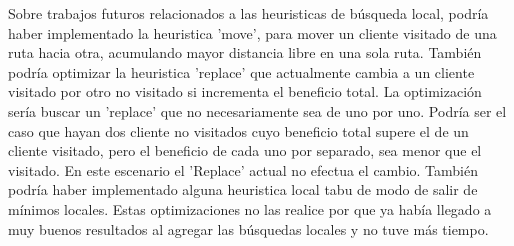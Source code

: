 \bigskip

Sobre trabajos futuros relacionados a las heuristicas de búsqueda local, podría haber implementado la heuristica 'move', para mover un cliente visitado de una ruta hacia otra, acumulando mayor distancia libre en una sola ruta. También podría optimizar la heuristica 'replace' que actualmente cambia a un cliente visitado por otro no visitado si incrementa el beneficio total. La optimización sería buscar un 'replace' que no necesariamente sea de uno por uno. Podría ser el caso que hayan dos cliente no visitados cuyo beneficio total supere el de un cliente visitado, pero el beneficio de cada uno por separado, sea menor que el visitado. En este escenario el 'Replace' actual no efectua el cambio. También podría haber implementado alguna heuristica local tabu de modo de salir de mínimos locales. Estas optimizaciones no las realice por que ya había llegado a muy buenos resultados al agregar las búsquedas locales y no tuve más tiempo.







